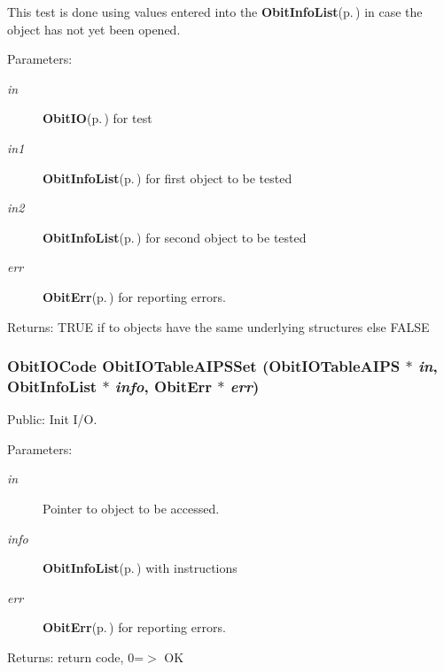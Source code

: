This test is done using values entered into the {\bf Obit\-Info\-List}{\rm (p.\,\pageref{structObitInfoList})} in case the object has not yet been opened. \begin{Desc}
\item[Parameters:]
\begin{description}
\item[{\em in}]{\bf Obit\-IO}{\rm (p.\,\pageref{structObitIO})} for test \item[{\em in1}]{\bf Obit\-Info\-List}{\rm (p.\,\pageref{structObitInfoList})} for first object to be tested \item[{\em in2}]{\bf Obit\-Info\-List}{\rm (p.\,\pageref{structObitInfoList})} for second object to be tested \item[{\em err}]{\bf Obit\-Err}{\rm (p.\,\pageref{structObitErr})} for reporting errors. \end{description}
\end{Desc}
\begin{Desc}
\item[Returns:]TRUE if to objects have the same underlying structures else FALSE \end{Desc}
\subsubsection{\setlength{\rightskip}{0pt plus 5cm}Obit\-IOCode Obit\-IOTable\-AIPSSet ({\bf Obit\-IOTable\-AIPS} $\ast$ {\em in}, {\bf Obit\-Info\-List} $\ast$ {\em info}, {\bf Obit\-Err} $\ast$ {\em err})}\label{ObitIOTableAIPS_8h_a11}


Public: Init I/O. 

\begin{Desc}
\item[Parameters:]
\begin{description}
\item[{\em in}]Pointer to object to be accessed. \item[{\em info}]{\bf Obit\-Info\-List}{\rm (p.\,\pageref{structObitInfoList})} with instructions \item[{\em err}]{\bf Obit\-Err}{\rm (p.\,\pageref{structObitErr})} for reporting errors. \end{description}
\end{Desc}
\begin{Desc}
\item[Returns:]return code, 0=$>$ OK \end{Desc}
